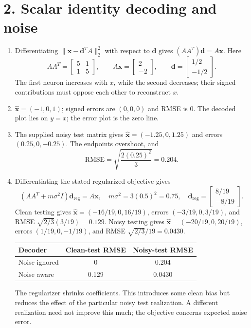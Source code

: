\documentclass[10pt,letterpaper]{article}
\newcommand{\vct}[1]{\boldsymbol{#1}}
\begin{document}
\section*{2. Scalar identity decoding and noise}
\begin{enumerate}[label=\textbf{2\alph*.}]
\item Differentiating \(\|\vct{x}-\vct{d}^{T}A\|_2^2\) with respect to \(\vct{d}\) gives \((AA^T)\vct{d}=A\vct{x}\). Here
\[
AA^T=\begin{bmatrix}5&1\\1&5\end{bmatrix},\qquad
A\vct{x}=\begin{bmatrix}2\\-2\end{bmatrix},\qquad
\boxed{\vct{d}=\begin{bmatrix}1/2\\-1/2\end{bmatrix}}.
\]
The first neuron increases with \(x\), while the second decreases; their signed contributions must oppose each other to reconstruct \(x\).
\item \(\hat{\vct{x}}=(-1,0,1)\); signed errors are \((0,0,0)\) and RMSE is \(0\). The decoded plot lies on \(y=x\); the error plot is the zero line.
\item The supplied noisy test matrix gives \(\hat{\vct{x}}=(-1.25,0,1.25)\) and errors \((0.25,0,-0.25)\). The endpoints overshoot, and
\[
\mathrm{RMSE}=\sqrt{\frac{2(0.25)^2}{3}}=0.204.
\]
\item Differentiating the stated regularized objective gives
\[
\boxed{(AA^T+m\sigma^2 I)\vct{d}_{\mathrm{reg}}=A\vct{x}},\quad
m\sigma^2=3(0.5)^2=0.75,\quad
\vct{d}_{\mathrm{reg}}=\begin{bmatrix}8/19\\-8/19\end{bmatrix}.
\]
Clean testing gives \(\hat{\vct{x}}=(-16/19,0,16/19)\), errors \((-3/19,0,3/19)\), and RMSE \(\sqrt{2/3}(3/19)=0.129\). Noisy testing gives \(\hat{\vct{x}}=(-20/19,0,20/19)\), errors \((1/19,0,-1/19)\), and RMSE \(\sqrt{2/3}/19=0.0430\).
\begin{center}\begin{tabular}{lcc}\toprule Decoder & Clean-test RMSE & Noisy-test RMSE\\\midrule
Noise ignored & 0 & 0.204\\
Noise aware & 0.129 & 0.0430\\\bottomrule\end{tabular}\end{center}
The regularizer shrinks coefficients. This introduces some clean bias but reduces the effect of the particular noisy test realization. A different realization need not improve this much; the objective concerns expected noise error.
\end{enumerate}
\end{document}
